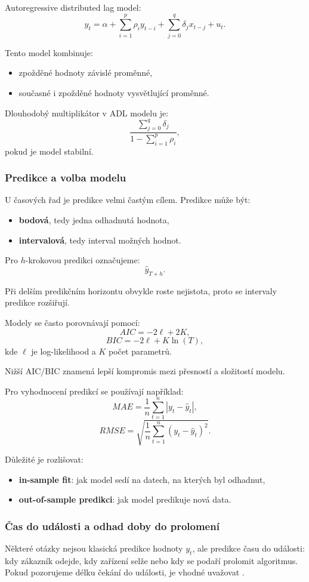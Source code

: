 Autoregressive distributed lag model:
\[
    y_t=
    \alpha+
    \sum_{i=1}^{p}\rho_i y_{t-i}
    +
    \sum_{j=0}^{q}\delta_j x_{t-j}
    +u_t.
\]

Tento model kombinuje:
\begin{itemize}
    \item zpožděné hodnoty závislé proměnné,
    \item současné i zpožděné hodnoty vysvětlující proměnné.
\end{itemize}

Dlouhodobý multiplikátor v ADL modelu je:
\[
    \frac{\sum_{j=0}^{q}\delta_j}{1-\sum_{i=1}^{p}\rho_i},
\]
pokud je model stabilní.

\subsubsection{Predikce a volba modelu}

U časových řad je predikce velmi častým cílem. Predikce může být:
\begin{itemize}
    \item \textbf{bodová}, tedy jedna odhadnutá hodnota,
    \item \textbf{intervalová}, tedy interval možných hodnot.
\end{itemize}

Pro $h$-krokovou predikci označujeme:
\[
    \widehat y_{T+h}.
\]

Při delším predikčním horizontu obvykle roste nejistota, proto se intervaly predikce rozšiřují.

Modely se často porovnávají pomocí:
\[
    AIC=-2\ell+2K,
\]
\[
    BIC=-2\ell+K\ln(T),
\]
kde $\ell$ je log-likelihood a $K$ počet parametrů.

Nižší AIC/BIC znamená lepší kompromis mezi přesností a složitostí modelu.

Pro vyhodnocení predikcí se používají například:
\[
    MAE=\frac{1}{n}\sum_{t=1}^{n}|y_t-\hat y_t|,
\]
\[
    RMSE=\sqrt{\frac{1}{n}\sum_{t=1}^{n}(y_t-\hat y_t)^2}.
\]

Důležité je rozlišovat:
\begin{itemize}
    \item \textbf{in-sample fit}: jak model sedí na datech, na kterých byl odhadnut,
    \item \textbf{out-of-sample predikci}: jak model predikuje nová data.
\end{itemize}

\subsubsection{Čas do události a odhad doby do prolomení}
Některé otázky nejsou klasická predikce hodnoty \(y_t\), ale predikce času do události: kdy zákazník
odejde, kdy zařízení selže nebo kdy se podaří prolomit algoritmus. Pokud pozorujeme délku čekání do
události, je vhodné uvažovat .

